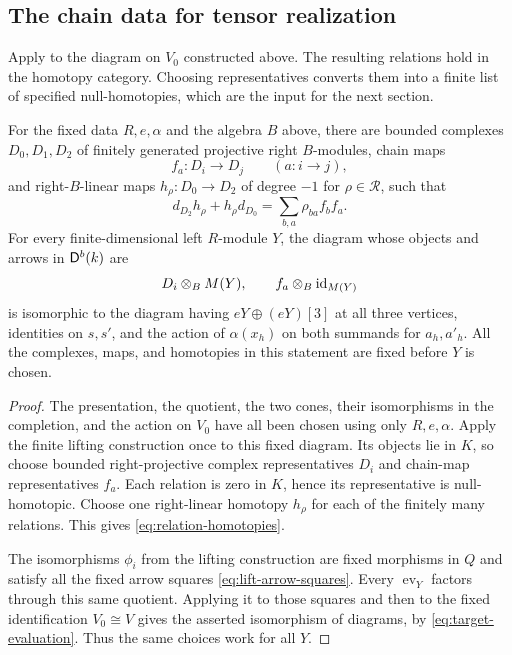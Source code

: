 \subsection{The chain data for tensor realization}

Apply  to the diagram on $V_0$ constructed
above.  The resulting relations hold in the homotopy category.
Choosing representatives converts them into a finite list of
specified null-homotopies, which are the input for the next section.

\begin{proposition}\label{prop:lifted-diagram}
For the fixed data $R,e,\alpha$ and the algebra $B$ above, there are
bounded complexes $D_0,D_1,D_2$ of finitely generated projective
right $B$-modules, chain maps
\[
  f_a:D_i\longrightarrow D_j\qquad(a:i\to j),
\]
and right-$B$-linear maps $h_\rho:D_0\to D_2$ of degree $-1$
for $\rho\in\mathcal R$, such that
\begin{equation}\label{eq:relation-homotopies}
  d_{D_2}h_\rho+h_\rho d_{D_0}
      =\sum_{b,a}\rho_{ba}f_bf_a.
\end{equation}
For every finite-dimensional left $R$-module $Y$, the diagram
whose objects and arrows in $\mathsf D^b(k)$ are
\begin{equation}\label{eq:evaluated-diagram}
  D_i\otimes_B M(Y),\qquad f_a\otimes_B\operatorname{id}_{M(Y)}
\end{equation}
is isomorphic to the diagram having $eY\oplus(eY)[3]$ at all three
vertices, identities on $s,s'$, and the action of $\alpha(x_h)$
on both summands for $a_h,a'_h$.
All the complexes, maps, and homotopies in this statement are fixed
before $Y$ is chosen.
\end{proposition}

\begin{proof}
The presentation, the quotient, the two cones, their isomorphisms in
the completion, and the action on $V_0$ have all been chosen using
only $R,e,\alpha$.  Apply the finite lifting construction once to
this fixed diagram.  Its objects lie in $K$, so choose bounded
right-projective complex representatives $D_i$ and chain-map
representatives $f_a$.  Each relation is zero in $K$, hence its
representative is null-homotopic.  Choose one right-linear
homotopy $h_\rho$ for each of the finitely many relations.
This gives \eqref{eq:relation-homotopies}.

The isomorphisms $\phi_i$ from the lifting construction are fixed
morphisms in $Q$ and satisfy all the fixed arrow squares
\eqref{eq:lift-arrow-squares}.  Every $\operatorname{ev}_Y$ factors
through this same quotient.  Applying it to those squares and then
to the fixed identification $V_0\cong V$ gives the asserted
isomorphism of diagrams, by \eqref{eq:target-evaluation}.
Thus the same choices work for all $Y$.
\end{proof}

